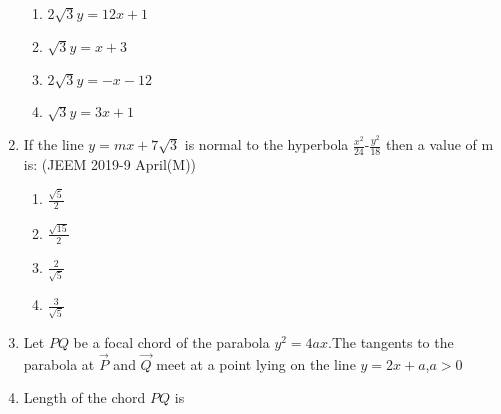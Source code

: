 \begin{enumerate}
\begin{multicols}{2}
\begin{enumerate}
    		\item $2\sqrt{3}y=12x+1$ 
    		\item $\sqrt{3}y=x+3$
    		\item $2\sqrt{3}y=-x-12$ 
    		\item $\sqrt{3}y=3x+1$
	\end{enumerate}
\end{multicols}   
\item If the line $y=mx+7\sqrt{3}$ is normal to the hyperbola $\frac{x^2}{24}$-$\frac{y^2}{18}$ then a value of m is: 
     \hfill{(JEEM 2019-9 April(M))}
	\begin{multicols}{2}
\begin{enumerate}
    		\item $\frac{\sqrt{5}}{2}$ 
    		\item $\frac{\sqrt{15}}{2}$
    		\item $\frac{2}{\sqrt5}$
    		\item $\frac{3}{\sqrt5}$
	\end{enumerate}
\end{multicols}
\item[] Let $PQ$ be a focal chord of the parabola $y^2=4ax$.The tangents to the parabola at $\Vec{P}$ and $\Vec{Q}$ meet at a point lying on the line $y=2x+a$,$a>0$
\item Length of the chord $PQ$ is


\end{enumerate}

